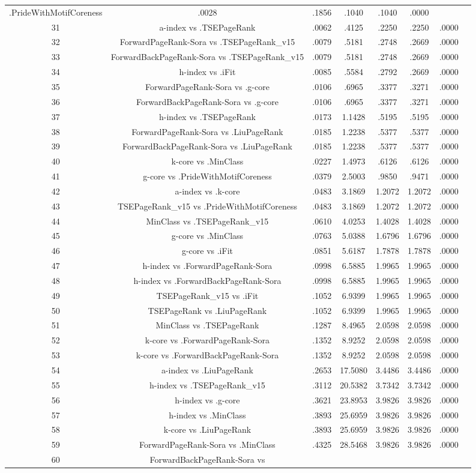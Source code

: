 \documentclass[a4paper,10pt]{article}
\begin{document}
\begin{landscape}
\begin{table}[!htp]
\begin{tabular}{cccccccc}
.PrideWithMotifCoreness&.0028&.1856&.1040&.1040&.0000\\31&a-index vs .TSEPageRank&.0062&.4125&.2250&.2250&.0000\\32&ForwardPageRank-Sora vs .TSEPageRank_v15&.0079&.5181&.2748&.2669&.0000\\33&ForwardBackPageRank-Sora vs .TSEPageRank_v15&.0079&.5181&.2748&.2669&.0000\\34&h-index vs .iFit&.0085&.5584&.2792&.2669&.0000\\35&ForwardPageRank-Sora vs .g-core&.0106&.6965&.3377&.3271&.0000\\36&ForwardBackPageRank-Sora vs .g-core&.0106&.6965&.3377&.3271&.0000\\37&h-index vs .TSEPageRank&.0173&1.1428&.5195&.5195&.0000\\38&ForwardPageRank-Sora vs .LiuPageRank&.0185&1.2238&.5377&.5377&.0000\\39&ForwardBackPageRank-Sora vs .LiuPageRank&.0185&1.2238&.5377&.5377&.0000\\40&k-core vs .MinClass&.0227&1.4973&.6126&.6126&.0000\\41&g-core vs .PrideWithMotifCoreness&.0379&2.5003&.9850&.9471&.0000\\42&a-index vs .k-core&.0483&3.1869&1.2072&1.2072&.0000\\43&TSEPageRank_v15 vs .PrideWithMotifCoreness&.0483&3.1869&1.2072&1.2072&.0000\\44&MinClass vs .TSEPageRank_v15&.0610&4.0253&1.4028&1.4028&.0000\\45&g-core vs .MinClass&.0763&5.0388&1.6796&1.6796&.0000\\46&g-core vs .iFit&.0851&5.6187&1.7878&1.7878&.0000\\47&h-index vs .ForwardPageRank-Sora&.0998&6.5885&1.9965&1.9965&.0000\\48&h-index vs .ForwardBackPageRank-Sora&.0998&6.5885&1.9965&1.9965&.0000\\49&TSEPageRank_v15 vs .iFit&.1052&6.9399&1.9965&1.9965&.0000\\50&TSEPageRank vs .LiuPageRank&.1052&6.9399&1.9965&1.9965&.0000\\51&MinClass vs .TSEPageRank&.1287&8.4965&2.0598&2.0598&.0000\\52&k-core vs .ForwardPageRank-Sora&.1352&8.9252&2.0598&2.0598&.0000\\53&k-core vs .ForwardBackPageRank-Sora&.1352&8.9252&2.0598&2.0598&.0000\\54&a-index vs .LiuPageRank&.2653&17.5080&3.4486&3.4486&.0000\\55&h-index vs .TSEPageRank_v15&.3112&20.5382&3.7342&3.7342&.0000\\56&h-index vs .g-core&.3621&23.8953&3.9826&3.9826&.0000\\57&h-index vs .MinClass&.3893&25.6959&3.9826&3.9826&.0000\\58&k-core vs .LiuPageRank&.3893&25.6959&3.9826&3.9826&.0000\\59&ForwardPageRank-Sora vs .MinClass&.4325&28.5468&3.9826&3.9826&.0000\\60&ForwardBackPageRank-Sora vs 
\end{tabular}
\end{table}
\end{landscape}
\end{document}
